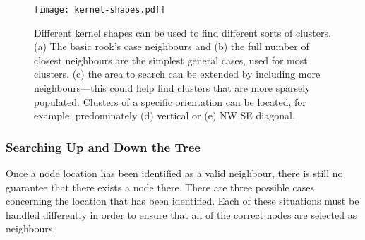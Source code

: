 \begin{figure}[tbh]
	\centering
	\texttt{[image: kernel-shapes.pdf]}

	\caption[Different kernel shapes for different clusters.]{Different kernel
		shapes can be used to find different sorts of clusters. (a) The basic
		rook's case neighbours and (b) the full number of closest neighbours
		are the simplest general cases, used for most clusters. (c) the area to
		search can be extended by including more neighbours---this could help
		find clusters that are more sparsely populated. Clusters of a specific
		orientation can be located, for example, predominately (d) vertical or
		(e) NW SE diagonal.}\label{fig:kernel-shapes}
\end{figure}

\subsubsection{Searching Up and Down the Tree}
\label{ssub:searching_up_and_down_the_tree}

Once a node location has been identified as a valid neighbour, there is still
no guarantee that there exists a node there. There are three possible cases
concerning the location that has been identified. Each of these situations must
be handled differently in order to ensure that all of the correct nodes are
selected as neighbours.

